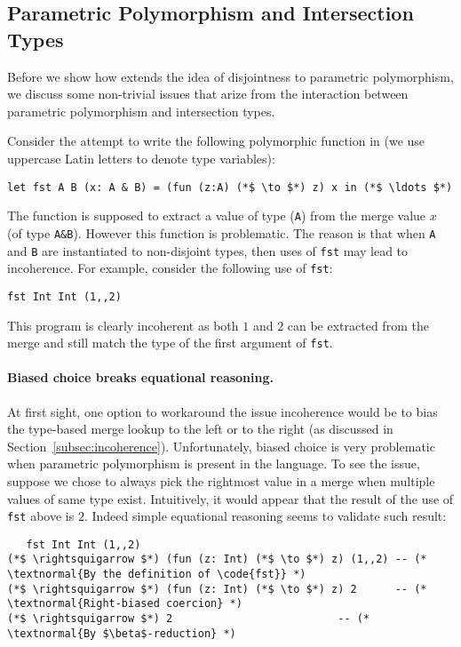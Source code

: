 \subsection{Parametric Polymorphism and Intersection Types}\label{subsec:polymorphism}
Before we show how \namedis extends the idea of disjointness to parametric
polymorphism, we discuss some non-trivial issues that arize from
the interaction between parametric polymorphism and intersection types.
\begin{comment}
Dunfield~\cite{} provides a
good illustrative example of the issues that arise when combining
disjoint intersection types and parametric polymorphism:
\[\lambda x. {\bf let}~y = 0 \mergeop x~{\bf in}~x\]
\end{comment}
Consider the attempt to write
the following polymorphic function in \namedis (we use
uppercase Latin letters to denote type variables):
\begin{lstlisting}
let fst A B (x: A & B) = (fun (z:A) (*$ \to $*) z) x in (*$ \ldots $*)
\end{lstlisting}
The
 function is supposed to extract a value of type
(\lstinline{A}) from the merge value $x$ (of type \lstinline{A&B}). However
this function is problematic.  The reason is that when
\lstinline{A} and \lstinline{B} are instantiated to non-disjoint
types, then uses of \lstinline{fst} may lead to incoherence.
For example, consider the following use of \lstinline{fst}:
\begin{lstlisting}
fst Int Int (1,,2)
\end{lstlisting}
\noindent This program is clearly incoherent as both
$1$ and $2$ can be extracted from the merge and still match the type
of the first argument of \lstinline{fst}.

\paragraph{Biased choice breaks equational reasoning.} At first sight, one option
to workaround the issue incoherence would be to bias the type-based merge lookup
to the left or to the right (as discussed in
Section~\ref{subsec:incoherence}). Unfortunately, biased choice is
very problematic when parametric polymorphism is present in the language.
To see the issue, suppose we chose to always pick the
rightmost value in a merge when multiple values of same type exist.
Intuitively, it would appear that the result of the use of
\lstinline{fst} above is $2$. Indeed simple equational reasoning
seems to validate such result:
\begin{lstlisting}
   fst Int Int (1,,2)
(*$ \rightsquigarrow $*) (fun (z: Int) (*$ \to $*) z) (1,,2) -- (* \textnormal{By the definition of \code{fst}} *)
(*$ \rightsquigarrow $*) (fun (z: Int) (*$ \to $*) z) 2      -- (* \textnormal{Right-biased coercion} *)
(*$ \rightsquigarrow $*) 2                          -- (* \textnormal{By $\beta$-reduction} *)
\end{lstlisting}

